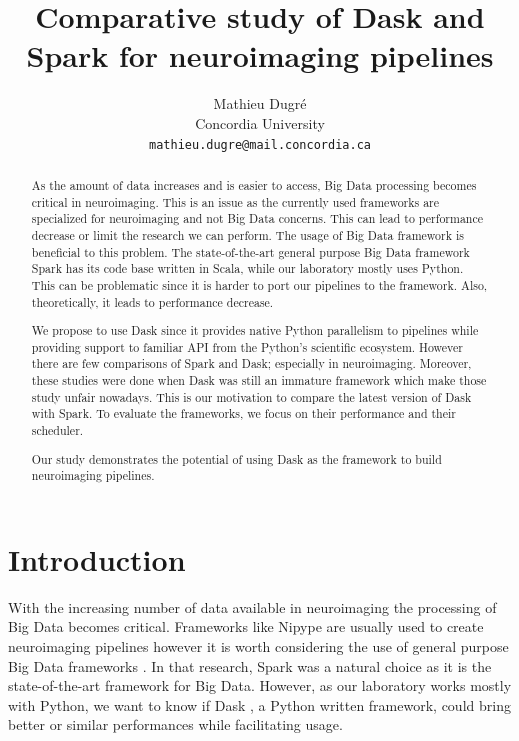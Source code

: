 \documentclass[11pt,a4paper]{article}
\title{Comparative study of Dask and Spark for neuroimaging pipelines}
\author{Mathieu Dugr{\'e} \\
  Concordia University \\
  \texttt{mathieu.dugre@mail.concordia.ca}\\}
\date{}
\begin{document}
\maketitle
\begin{abstract}

As the amount of data increases and is easier to access, Big Data processing becomes
critical in neuroimaging.
This is an issue as the currently used frameworks are specialized for neuroimaging
and not Big Data concerns. This can lead to performance decrease or limit the
research we can perform.
The usage of Big Data framework is beneficial to this problem. The state-of-the-art
general purpose Big Data framework Spark has its code base written in Scala, while
our laboratory mostly uses Python. This can be problematic since it is harder to port
our pipelines to the framework. Also, theoretically, it leads to performance
decrease.

We propose to use Dask since it provides native Python parallelism to pipelines while
providing support to familiar API from the Python's scientific ecosystem. However
there are few comparisons of Spark and Dask; especially in neuroimaging. Moreover,
these studies were done when Dask was still an immature framework which make those
study unfair nowadays. This is our motivation to compare the latest version of Dask
with Spark.
To evaluate the frameworks, we focus on their performance and their scheduler.

Our study demonstrates the potential of using Dask as the framework to build
neuroimaging pipelines.

\end{abstract}

\section{Introduction}
With the increasing number of data available in neuroimaging \citep{ALFAROALMAGRO:18,
UKBioBank:18} the processing of Big Data becomes critical. Frameworks like Nipype
\citep{Nipype:11} are usually used to create neuroimaging pipelines however it is
worth considering the use of general purpose Big Data frameworks
\citep{Hayot-Sasson:17}. In that research, Spark \citep{Spark:16} was a natural
choice as it is the state-of-the-art framework for Big Data. However, as our
laboratory works mostly with Python, we want to know if Dask \citep{Dask:15}, a
Python written framework, could bring better or similar performances while
facilitating usage.
\end{document}
